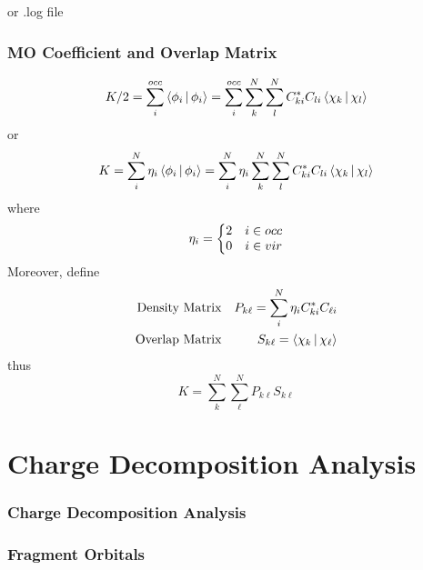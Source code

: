 \documentclass[10pt,aspectratio=43]{beamer}
\newcommand{\code}[1]{\colorbox{codegray}{{\Consolas#1}}}
\numberwithin{equation}{section}
\begin{document}
\begin{frame}
or \code{.log} file
\makeset
\end{frame}

\begin{frame}
\frametitle{MO Coefficient and Overlap Matrix}
\begin{equation}\label{key}
K/2 = \sum_i^{occ}\Braket{\phi_i | \phi_i} = \sum_i^{occ} \sum_k^N\sum_l^N C_{ki}^*C_{li} \Braket{\chi_k | \chi_l}
\end{equation}
or
\begin{align}\label{key}
K = \sum_i^N \eta_i\Braket{\phi_i | \phi_i} = \sum_i^N \eta_i \sum_k^N\sum_l^N C_{ki}^*C_{li} \Braket{\chi_k | \chi_l} 
\end{align}
where 
\begin{equation}\label{key}
\eta_i = 
\left\{
\mqty{2 & i\in occ\\ 0 & i\in vir}
\right.
\end{equation}
Moreover, define
\begin{align}
\text{Density Matrix} & & P_{k\ell} = \sum_i^N \eta_i C_{ki}^* C_{\ell i} \\
\text{Overlap Matrix} & & S_{k\ell} = \Braket{\chi_k | \chi_\ell}
\end{align}
thus
\begin{equation}\label{key}
K = \sum_k^N \sum_\ell^N P_{k\ell} S_{k\ell}
\end{equation}

\end{frame}

\section{Charge Decomposition Analysis}
\begin{frame}
\frametitle{Charge Decomposition Analysis}

\end{frame}

\begin{frame}
\frametitle{Fragment Orbitals}

\end{frame}
	
\end{document}
